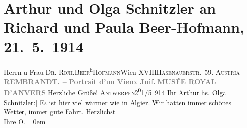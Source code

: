 

         
         \renewcommand{\erwaehntePersonen}{Personen: Richard Beer-Hofmann, Paula Beer-Hofmann,  Rembrandt van Rijn}
         \renewcommand{\erwaehnteInstitutionen}{Institutionen: Königliches Museum der Schönen Künste}
         \renewcommand{\erwaehnteOrte}{Orte: Algiers, Antwerpen, Hasenauerstraße, Wien, XVIII., Währing, Österreich}
         \renewcommand{\erwaehnteWerke}{Werke: Alter Mann}
               \section[Arthur und Olga Schnitzler an Richard und Paula Beer-Hofmann, 21. 5. 1914]{ Arthur und Olga Schnitzler an Richard und Paula Beer-Hofmann,
               21. 5. 1914}\nopagebreak{}\rehead{ }\begin{ledgroupsized}[t]{13cm}\normalsize\beginnumbering \toendnotes[C]{\smallbreak\pagebreak[2]} 
\pstart{}{\pb}Herrn u Frau \textsc{Dr. Rich.}\pend{}\pstart{}\textsc{Beer}\substVorne{}\textsuperscript{h}\substDazwischen{}\textsc{H}\substHinten{}\textsc{ofmann}\pend{}\pstart{}Wien XVIII\pend{}\pstart{}\textsc{Hasenauerstr. 59}. \pend{}\pstart{}\textsc{Austria}\pend{}{\bigskip}\pstart
           \noindent{}\centering{}{\pb}\textcolor{gray}{\textbf{REMBRANDT. – Portrait d’un Vieux Juif.}}\pend
           \pstart
           \noindent{}\centering{}\textcolor{gray}{\textbf{MUSÉE ROYAL D’ANVERS}}\pend
           \pstart
           {\pb}Herzliche Grüße!\pend
           \pstart
           \textsc{Antwerpen}2\substVorne{}\textsuperscript{0}\substDazwischen{}1\substHinten{}/5 914\pend
           \pstart Ihr \spacefill\mbox{Arthur}\pend{}\pstart
           \noindent{}{[}hs. Olga Schnitzler:{]} Es ist hier viel wärmer wie in Algier. Wir hatten immer schönes Wetter, immer gute
               Fahrt.\pend
           \pstart
           Herzlichst{\\[\baselineskip]}Ihre \spacefill\mbox{O.}\pend
           \leftskip=0em{}
         

\end{ledgroupsized}
